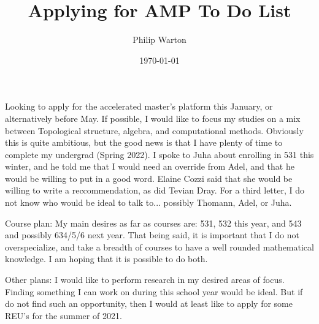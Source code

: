 \documentclass{article}
\begin{document}
\title{Applying for AMP To Do List}
\author{Philip Warton}
\date{\today}
\maketitle
Looking to apply for the accelerated master's platform this January, or alternatively before May.
If possible, I would like to focus my studies on a mix between Topological structure, algebra, and computational methods.
Obviously this is quite ambitious, but the good news is that I have plenty of time to complete my undergrad (Spring 2022).
I spoke to Juha about enrolling in 531 this winter, and he told me that I would need an override from Adel, and that he would
be willing to put in a good word. Elaine Cozzi said that she would be willing to write a reccommendation, as did Tevian Dray.
For a third letter, I do not know who would be ideal to talk to... possibly Thomann, Adel, or Juha.

Course plan:
My main desires as far as courses are: 531, 532 this year, and 543 and possibly 634/5/6 next year. That being said, it is important that I
do not overspecialize, and take a breadth of courses to have a well rounded mathematical knowledge. I am hoping that it is possible to do both.

Other plans: I would like to perform research in my desired areas of focus. Finding something I can work on during this school year would be
ideal. But if do not find such an opportunity, then I would at least like to apply for some REU's for the summer of 2021.
\end{document}

